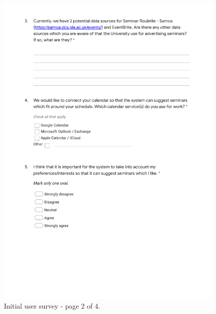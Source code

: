 \documentclass{l4proj}
\begin{document}
\begin{appendices}
\begin{figure}[htb]
    \centering
    \includegraphics[width=\linewidth]{images/initial_user_survey_2.pdf}    
    \caption{Initial user survey - page 2 of 4.}
    \label{fig:initial_user_survey_2} 
\end{figure}


\end{appendices}
\end{document}
